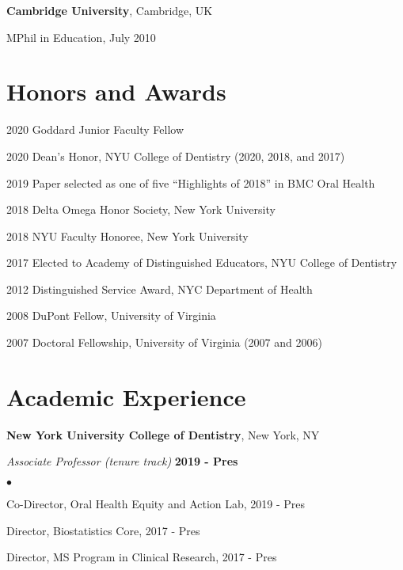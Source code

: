 \documentclass[margin,line]{res}
\newenvironment{list1}{
  \begin{list}{\ding{113}}{%
      \setlength{\itemsep}{0in}
      \setlength{\parsep}{0in} \setlength{\parskip}{0in}
      \setlength{\topsep}{0in} \setlength{\partopsep}{0in} 
      \setlength{\leftmargin}{0.17in}}}{\end{list}}
\newenvironment{list2}{
  \begin{list}{$\bullet$}{%
      \setlength{\itemsep}{0in}
      \setlength{\parsep}{0in} \setlength{\parskip}{0in}
      \setlength{\topsep}{0in} \setlength{\partopsep}{0in} 
      \setlength{\leftmargin}{0.2in}}}{\end{list}}
\begin{document}
\begin{resume}
{\bf Cambridge University}, Cambridge, UK\\
\vspace*{-.1in}
\begin{list1}
\item[] MPhil in Education, July 2010
\end{list1}


\section{\sc Honors and Awards} 
2020 Goddard Junior Faculty Fellow

\vspace*{-2.5mm}
2020 Dean’s Honor, NYU College of Dentistry (2020, 2018, and 2017)

\vspace*{-2.5mm}
2019 Paper selected as one of five “Highlights of 2018” in BMC Oral Health 

\vspace*{-2.5mm}
2018 Delta Omega Honor Society, New York University

\vspace*{-2.5mm}
2018 NYU Faculty Honoree, New York University

\vspace*{-2.5mm}
2017 Elected to Academy of Distinguished Educators, NYU College of Dentistry 

\vspace*{-2.5mm}
2012 Distinguished Service Award, NYC Department of Health

\vspace*{-2.5mm}
2008 DuPont Fellow, University of Virginia

\vspace*{-2.5mm}
2007 Doctoral Fellowship, University of Virginia (2007 and 2006)

%

\section{\sc Academic Experience}
{\bf New York University College of Dentistry}, New York, NY

\vspace{-.3cm}
{\em Associate Professor (tenure track)} \hfill {\bf 2019 - Pres} \\
\vspace*{-.2cm}
\begin{list2}
\item Co-Director, Oral Health Equity and Action Lab, 2019 - Pres
\item Director, Biostatistics Core, 2017 - Pres
\item Director, MS Program in Clinical Research, 2017 - Pres
\end{list2}


\end{resume}
\end{document}
